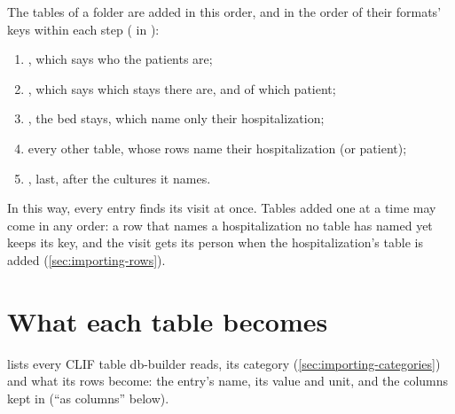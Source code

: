 The tables of a folder are added in this order, and in the order of their formats' keys within
each step ( in ):
\begin{enumerate}
\item {}, which says who the patients are;
\item {}, which says which stays there are, and of which patient;
\item {}, the bed stays, which name only their hospitalization;
\item every other table, whose rows name their hospitalization (or patient);
\item {}, last, after the cultures it names.
\end{enumerate}
In this way, every entry finds its visit at once. Tables added one at a time may come in any
order: a row that names a hospitalization no table has named yet keeps its key, and the visit
gets its person when the hospitalization's table is added (\cref{sec:importing-rows}).

\section{What each table becomes}
\label{sec:clif-tables}

 lists every CLIF table db-builder reads, its category
(\cref{sec:importing-categories}) and what its rows become: the entry's name, its value and unit,
and the columns kept in  (``as columns'' below).

